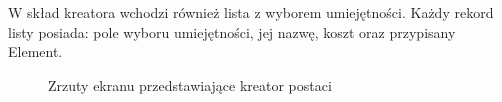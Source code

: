 \documentclass{SGGW-thesis}
\begin{document}
W skład kreatora wchodzi również lista z wyborem umiejętności. Każdy rekord listy posiada: pole wyboru umiejętności, jej nazwę, koszt oraz przypisany Element.
\pagebreak
\begin{figure}[H]
  \hfill
  \hfill
  \hfill
  \caption{Zrzuty ekranu przedstawiające kreator postaci}
\end{figure}
\pagebreak
\end{document}
